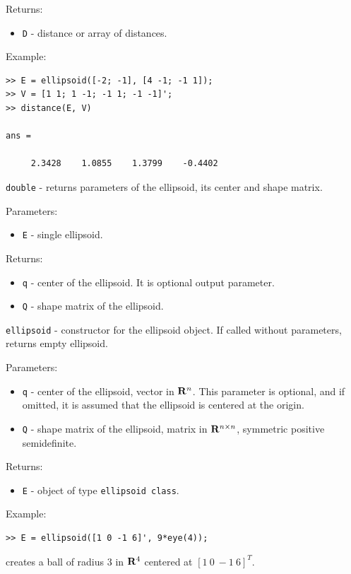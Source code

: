 \documentclass{report}
\begin{document}
Returns:
\begin{itemize}
\item {\tt D} - distance or array of distances.
\end{itemize}

Example:
{\tt \begin{verbatim}
>> E = ellipsoid([-2; -1], [4 -1; -1 1]);
>> V = [1 1; 1 -1; -1 1; -1 -1]';
>> distance(E, V)

ans =

     2.3428    1.0855    1.3799    -0.4402
\end{verbatim} }

\newpage

{\Large {\tt double}} - returns parameters of the ellipsoid, its center
and shape matrix.

Parameters:
\begin{itemize}
\item {\tt E} - single ellipsoid.
\end{itemize}

Returns:
\begin{itemize}
\item {\tt q} - center of the ellipsoid. It is optional output parameter.
\item {\tt Q} - shape matrix of the ellipsoid.
\end{itemize}

\newpage

{\Large {\tt ellipsoid}} - constructor for the ellipsoid object.
If called without parameters, returns empty ellipsoid.

Parameters:
\begin{itemize}
\item {\tt q} - center of the ellipsoid, vector in ${\bf R}^n$.
This parameter is optional, and if omitted, it is assumed that the ellipsoid
is centered at the origin.
\item {\tt Q} - shape matrix of the ellipsoid, matrix in ${\bf R}^{n\times n}$,
symmetric positive semidefinite.
\end{itemize}
Returns:
\begin{itemize}
\item {\tt E} - object of type {\tt ellipsoid class}.
\end{itemize}
Example:
{\tt \begin{verbatim}
>> E = ellipsoid([1 0 -1 6]', 9*eye(4));
\end{verbatim} }
creates a ball of radius $3$ in ${\bf R}^4$ centered at $[1 ~ 0 ~ -1 ~ 6]^T$.
\end{document}

